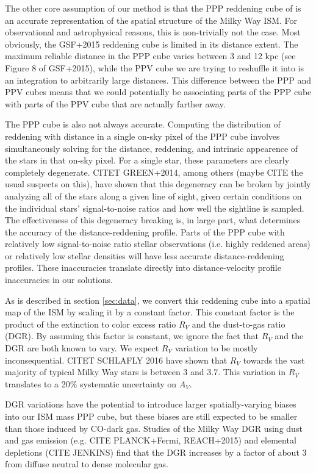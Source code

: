 The other core assumption of our method is that the PPP reddening cube of \citet{Green_2015}  is an accurate representation of the spatial structure of the Milky Way ISM. For observational and astrophysical reasons, this is non-trivially not the case. Most obviously, the GSF+2015 reddening cube is limited in its distance extent. The maximum reliable distance in the PPP cube varies between 3 and 12 kpc (see Figure 8 of GSF+2015), while the PPV cube we are trying to reshuffle it into is an integration to arbitrarily large distances. This difference between the PPP and PPV cubes means that we could potentially be associating parts of the PPP cube with parts of the PPV cube that are actually farther away.

The PPP cube is also not always accurate. Computing the distribution of reddening with distance in a single on-sky pixel of the PPP cube involves simultaneously solving for the distance, reddening, and intrinsic appearence of the stars in that on-sky pixel. For a single star, these parameters are clearly completely degenerate. CITET GREEN+2014, among others (maybe CITE the usual suspects on this), have shown that this degeneracy can be broken by jointly analyzing all of the stars along a given line of sight, given certain conditions on the individual stars' signal-to-noise ratios and how well the sightline is sampled. The effectiveness of this degeneracy breaking is, in large part, what determines the accuracy of the distance-reddening profile. Parts of the PPP cube with relatively low signal-to-noise ratio stellar observations (i.e. highly reddened areas) or relatively low stellar densities will have less accurate distance-reddening profiles. These inaccuracies translate directly into distance-velocity profile inaccuracies in our solutions. 

As is described in section \ref{sec:data}, we convert this reddening cube into a spatial map of the ISM by scaling it by a constant factor. This constant factor is the product of the extinction to color excess ratio $R_V$ and the dust-to-gas ratio (DGR). By assuming this factor is constant, we ignore the fact that $R_V$ and the DGR are both known to vary. We expect $R_V$ variation to be mostly inconsequential. CITET SCHLAFLY 2016 have shown that $R_V$ towards the vast majority of typical Milky Way stars is between 3 and 3.7. This variation in $R_V$ translates to a 20\% systematic uncertainty on $A_V$.

DGR variations have the potential to introduce larger spatially-varying biases into our ISM mass PPP cube, but these biases are still expected to be smaller than those induced by CO-dark gas. Studies of the Milky Way DGR using dust and gas emission (e.g. CITE PLANCK+Fermi, REACH+2015) and elemental depletions (CITE JENKINS) find that the DGR increases by a factor of about 3 from diffuse neutral to dense molecular gas. 

